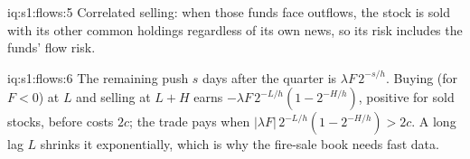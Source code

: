 \begin{solution}{iq:s1:flows:5}
Correlated selling: when those funds face outflows, the stock is sold with its other common holdings regardless of its own news, so its risk includes the
funds' flow risk.
\end{solution}

\begin{solution}{iq:s1:flows:6}
The remaining push $s$ days after the quarter is $\lambda F\,2^{-s/h}$. Buying (for $F < 0$) at $L$ and selling at $L + H$ earns
$-\lambda F\,2^{-L/h}(1 - 2^{-H/h})$, positive for sold stocks, before costs $2c$; the trade pays when $|\lambda F|\,2^{-L/h}(1 - 2^{-H/h}) > 2c$. A long lag
$L$ shrinks it exponentially, which is why the fire-sale book needs fast data.
\end{solution}

